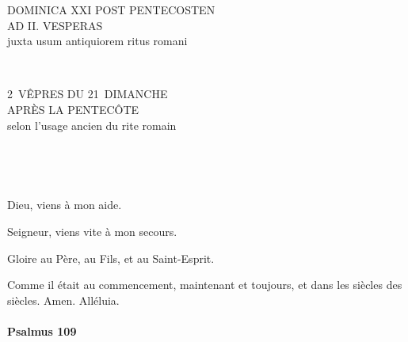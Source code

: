 \documentclass[twoside]{article}
\begin{document}
\null \newpage

\sloppy

\begin{paracol}[1]{2}

\begin{center}\begin{doublespace}

{
\MakeUppercase{\Large Dominica XXI post Pentecosten \\ ad II. Vesperas}\\
juxta usum antiquiorem ritus romani}
\end{doublespace}\end{center}


~~

\switchcolumn

\begin{center}\begin{doublespace}
{
\MakeUppercase{\Large 2\iemes~vêpres du 21\ieme~dimanche \\ après la Pentecôte}\\
selon l'usage ancien du rite romain
}
\end{doublespace}\end{center}

~~

~~

\vv Dieu, viens à mon aide.

\rr Seigneur, viens vite à mon secours.

\vv Gloire au Père, au Fils, et au Saint-Esprit.

\rr Comme il était au commencement, maintenant et toujours, et dans les siècles des siècles. Amen. Alléluia.

\switchcolumn*

\paragraph{Psalmus 109}



\end{paracol}
\end{document}
